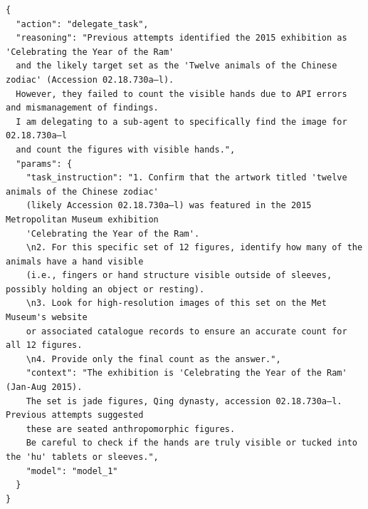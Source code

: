 \begin{tcolorbox}[
  title={\textbf{\small Attempt 3 - Main Decision}},
  boxrule=1pt,
  arc=0mm,
  colback=gray!5,
  colframe=gray!70,
  breakable,
  before skip=10pt,
  after skip=10pt,
  pad at break=2mm,
  parbox=false
]
\begin{verbatim}
{
  "action": "delegate_task",
  "reasoning": "Previous attempts identified the 2015 exhibition as 'Celebrating the Year of the Ram' 
  and the likely target set as the 'Twelve animals of the Chinese zodiac' (Accession 02.18.730a–l). 
  However, they failed to count the visible hands due to API errors and mismanagement of findings.
  I am delegating to a sub-agent to specifically find the image for 02.18.730a–l 
  and count the figures with visible hands.",
  "params": {
    "task_instruction": "1. Confirm that the artwork titled 'twelve animals of the Chinese zodiac' 
    (likely Accession 02.18.730a–l) was featured in the 2015 Metropolitan Museum exhibition 
    'Celebrating the Year of the Ram'.
    \n2. For this specific set of 12 figures, identify how many of the animals have a hand visible 
    (i.e., fingers or hand structure visible outside of sleeves, possibly holding an object or resting). 
    \n3. Look for high-resolution images of this set on the Met Museum's website 
    or associated catalogue records to ensure an accurate count for all 12 figures.
    \n4. Provide only the final count as the answer.",
    "context": "The exhibition is 'Celebrating the Year of the Ram' (Jan-Aug 2015). 
    The set is jade figures, Qing dynasty, accession 02.18.730a–l. Previous attempts suggested 
    these are seated anthropomorphic figures. 
    Be careful to check if the hands are truly visible or tucked into the 'hu' tablets or sleeves.",
    "model": "model_1"
  }
}
\end{verbatim}
\end{tcolorbox}


